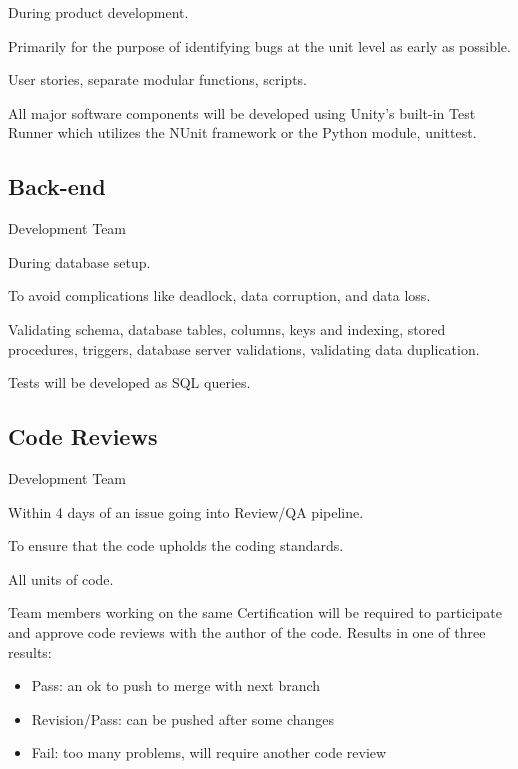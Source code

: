 \documentclass[letterpaper,10pt,english]{sphinxmanual}
\begin{document}
 During product development.

 Primarily for the purpose of identifying bugs at the unit level as early as possible.

 User stories, separate modular functions, scripts.

 All major software components will be developed using Unity’s built-in Test Runner which utilizes the NUnit framework or the Python module, unittest.


\subsection{Back-end}
\label{\detokenize{test_plan/strategy:back-end}}
 Development Team

 During database setup.

 To avoid complications like deadlock, data corruption, and data loss.

 Validating schema, database tables, columns, keys and indexing, stored procedures, triggers, database server validations, validating data duplication.

 Tests will be developed as SQL queries.


\subsection{Code Reviews}
\label{\detokenize{test_plan/strategy:code-reviews}}
 Development Team

 Within 4 days of an issue going into Review/QA pipeline.

 To ensure that the code upholds the coding standards.

 All units of code.

 Team members working on the same Certification will be required to participate and approve code reviews with the author of the code. Results in one of three results:
\begin{itemize}
\item {} 
Pass: an ok to push to merge with next branch

\item {} 
Revision/Pass: can be pushed after some changes

\item {} 
Fail: too many problems, will require another code review

\end{itemize}
\end{document}

